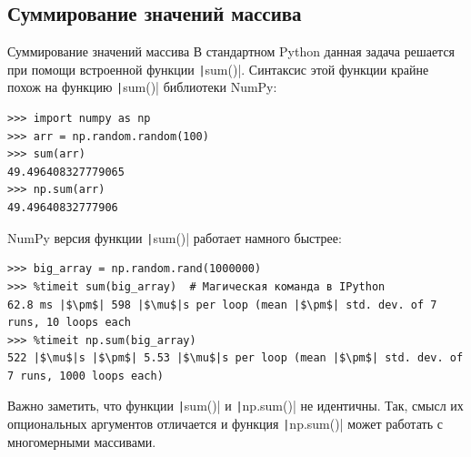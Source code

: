 \documentclass[aspectratio=169, mathserif]{beamer}	%
\begin{document}
\subsection{Суммирование значений массива}
\begin{frame}[fragile]{Суммирование значений массива}
\scriptsize
В стандартном Python данная задача решается при помощи встроенной функции \texttt|sum()|. Синтаксис этой функции крайне похож на функцию \texttt|sum()| библиотеки NumPy:

\begin{verbatim}
>>> import numpy as np
>>> arr = np.random.random(100)
>>> sum(arr)
49.496408327779065
>>> np.sum(arr)
49.49640832777906
\end{verbatim}

NumPy версия функции \texttt|sum()| работает намного быстрее:

\begin{verbatim}
>>> big_array = np.random.rand(1000000)
>>> %timeit sum(big_array)  # Магическая команда в IPython
62.8 ms |$\pm$| 598 |$\mu$|s per loop (mean |$\pm$| std. dev. of 7 runs, 10 loops each
>>> %timeit np.sum(big_array)
522 |$\mu$|s |$\pm$| 5.53 |$\mu$|s per loop (mean |$\pm$| std. dev. of 7 runs, 1000 loops each)
\end{verbatim}

Важно заметить, что функции \texttt|sum()| и \texttt|np.sum()| не идентичны. Так, смысл их опциональных аргументов отличается и функция \texttt|np.sum()| может работать с многомерными массивами.
\vfill
\end{frame}
\end{document}

